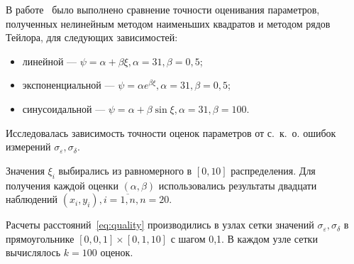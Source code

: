 В работе~\cite{budny15} было выполнено сравнение точности оценивания параметров,
полученных нелинейным методом наименьших квадратов и методом рядов Тейлора,
для следующих зависимостей:
\begin{itemize}
\item линейной --- \( \psi = \alpha + \beta \xi, \alpha = 31, \beta = 0{,}5 \);
\item экспоненциальной --- \( \psi = \alpha e^{\beta \xi}, \alpha = 31, \beta = 0{,}5 \);
\item синусоидальной --- \( \psi = \alpha + \beta \sin \xi, \alpha = 31, \beta = 100 \).
\end{itemize}

Исследовалась зависимость точности оценок параметров от с.~к.~о.
ошибок измерений \( \sigma_{\varepsilon}, \sigma_{\delta} \).

Значения \( \xi_i \) выбирались из равномерного в \( [0, 10] \) распределения.
Для получения каждой оценки \( ( \alpha, \beta ) \) использовались результаты
двадцати наблюдений \( ( x_i, y_i ), i = \overline{1, n}, n = 20 \).

Расчеты расстояний~\eqref{eq:quality} производились в узлах сетки значений
\( \sigma_{\varepsilon}, \sigma_{\delta} \) в прямоугольнике
\( [0, 0{,}1] \times [0{,}1, 10] \) с шагом 0{,}1.
В каждом узле сетки вычислялось \( k = 100 \) оценок.








